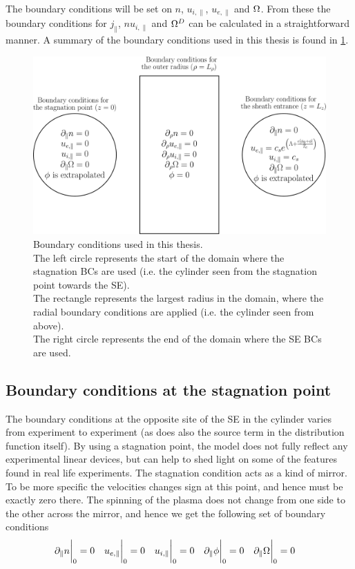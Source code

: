 The boundary conditions will be set on $n$, $u_{i,\|}$, $u_{e,\|}$ and $\Omega$.
From these the boundary conditions for $j_\|$, $nu_{i,\|}$ and $\Omega^D$ can be calculated in a straightforward manner.
A summary of the boundary conditions used in this thesis is found in \cref{fig:BCs}.
%
\begin{figure}[htb]
    \centering
    \includegraphics[width=1.0\textwidth]{fig/BCs}
    \caption{
        Boundary conditions used in this thesis.\\
        The left circle represents the start of the domain where the stagnation BCs are used (i.e. the cylinder seen from the stagnation point towards the SE).\\
        The rectangle represents the largest radius in the domain, where the radial boundary conditions are applied (i.e. the cylinder seen from above).\\
        The right circle represents the end of the domain where the SE BCs are used.\\
    }
    \label{fig:BCs}
\end{figure}

\subsection{Boundary conditions at the stagnation point}
The boundary conditions at the opposite site of the SE in the cylinder varies from experiment to experiment (as does also the source term in the distribution function itself).
By using a stagnation point, the model does not fully reflect any experimental linear devices, but can help to shed light on some of the features found in real life experiments.
The stagnation condition acts as a kind of mirror.
To be more specific the velocities changes sign at this point, and hence must be exactly zero there.
The spinning of the plasma does not change from one side to the other across the mirror, and hence we get the following set of boundary conditions
%
\begin{align*}
    &\partial_\| n \bigg|_0    =0 &
    &u_{e,\|} \bigg|_0         =0 &
    &u_{i,\|} \bigg|_0         =0 &
    &\partial_\| \phi \bigg|_0 =0 &
    &\partial_\|\Omega \bigg|_0   =0 &
\end{align*}

